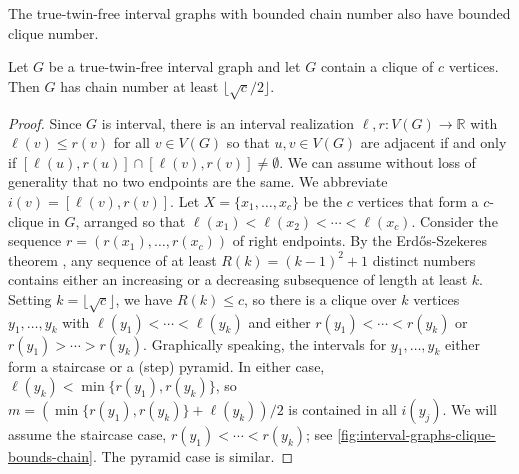 \documentclass{article}
\newcommand{\bR}{\ensuremath{\mathbb{R}}}
\begin{document}
The true-twin-free interval graphs with bounded chain number also have bounded clique number.
\begin{lemma}
\label{lem:interval-graphs-clique-bounds-chain}
Let $G$ be a true-twin-free interval graph and let $G$ contain a clique of $c$ vertices.
Then $G$ has chain number at least $\lfloor \sqrt c/2\rfloor$.
\end{lemma}
\begin{proof}
Since $G$ is interval, there is an interval realization $\ell, r : V(G) \to \bR$ with $\ell(v)\le r(v)$
for all $v\in V(G)$ so that $u,v\in V(G)$ are adjacent if and only if
$[\ell(u),r(u)]\cap[\ell(v),r(v)] \ne \emptyset$.  We can assume without loss of generality
that no two endpoints are the same. We abbreviate $i(v)= [\ell(v),r(v)]$.
	Let $X = \{x_1,\ldots,x_c\}$ be the $c$ vertices that form a $c$-clique in $G$,
	arranged so that $\ell(x_1)< \ell(x_2)<\cdots< \ell(x_c)$.
	Consider the sequence $r = (r(x_1),\ldots,r(x_c))$ of right endpoints.
	By the Erd{\H
o}s-Szekeres theorem \cite{ES35}, any sequence of at least $R(k) = (k-1)^2 + 1$ distinct numbers contains 
	either an increasing or a decreasing subsequence of length at least $k$.
	Setting $k=\lfloor \sqrt c\rfloor$, we have $R(k) \le c$,
	so there is a clique over $k$ vertices $y_1,\ldots,y_k$ with $\ell(y_1)<\cdots<\ell(y_k)$
	and either $r(y_1)<\cdots<r(y_k)$ or $r(y_1)>\cdots>r(y_k)$.
	Graphically speaking, the intervals for $y_1,\ldots,y_k$ either form a staircase or a (step) pyramid.
	In either case, $\ell(y_k) < \min\{r(y_1),r(y_k)\}$, so
	$m = (\min\{r(y_1),r(y_k)\} + \ell(y_k))/2$ is contained in all $i(y_j)$.
	We will assume the staircase case, $r(y_1)<\cdots<r(y_k)$; 
	see \cref{fig:interval-graphs-clique-bounds-chain}. 
	The pyramid case is similar.
	

\end{proof}
\end{document}
